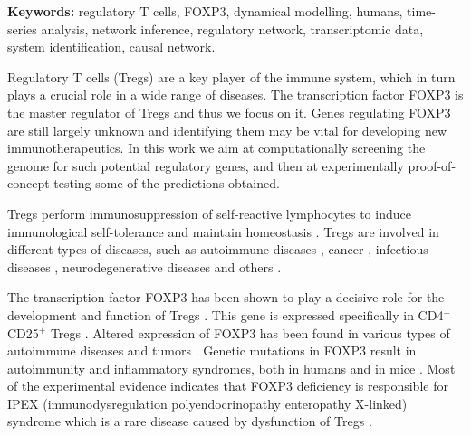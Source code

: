 \documentclass[oneside, 10pt, a4paper, twocolumn]{article}
\begin{document}
\vspace{0.5cm}

\textbf{Keywords:} regulatory T cells, FOXP3, dynamical modelling, humans, time-series analysis, network inference, regulatory network,  transcriptomic data, system identification, causal network.

\vspace{0.5cm}

Regulatory T cells (Tregs) are a key player of the immune system, which in turn plays a crucial role in a wide range of diseases. The transcription factor FOXP3 is the master regulator of Tregs and thus we focus on it. Genes regulating FOXP3 are still largely unknown and identifying them may be vital for developing new immunotherapeutics. In this work we aim at computationally screening the genome for such potential regulatory genes, and then at experimentally proof-of-concept testing some of the predictions obtained.

Tregs perform immunosuppression of self-reactive lymphocytes to induce immunological self-tolerance and maintain homeostasis \citep{janeway2012immunobiology, Li2015,Josefowicz2012}. Tregs are involved in different types of diseases, such as autoimmune diseases \citep{Dejaco2006, Fehervari2004, Sakaguchi2006}, cancer \citep{Shang2015, Tanaka2017,franchina2018survival}, infectious diseases \citep{Joosten2008, StephenVictor2017}, neurodegenerative diseases \citep{Baruch2015, He2013} and others \citep{Cools2007}. 

The transcription factor FOXP3  has been shown to play a decisive role for the development and function of Tregs \citep{Ziegler2006}. This gene is expressed specifically in CD4$^{+}$CD25$^{+}$ Tregs \citep{hori2003control, rudensky2011regulatory}. Altered expression of FOXP3 has been found in various types of autoimmune diseases \citep{liu2013ipex} and tumors \citep{cunha2012foxp3, martin2010human,szylberg2016role}. 
Genetic mutations in FOXP3 result in autoimmunity and inflammatory syndromes, both in humans and in mice \citep{mayer2014few, mercer2009biology,Fontenot2003,Khattri2003}. Most of the experimental evidence indicates that FOXP3 deficiency is responsible for IPEX (immunodysregulation polyendocrinopathy enteropathy X-linked) syndrome which is a rare disease caused by dysfunction of Tregs \citep{bennett2001immune}.
\end{document}
